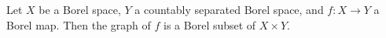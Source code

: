 Let $X$ be a Borel space, $Y$ a countably separated Borel space, and $f: X \to Y$ a Borel map. Then the graph of $f$ is a Borel subset of $X \times Y$.
